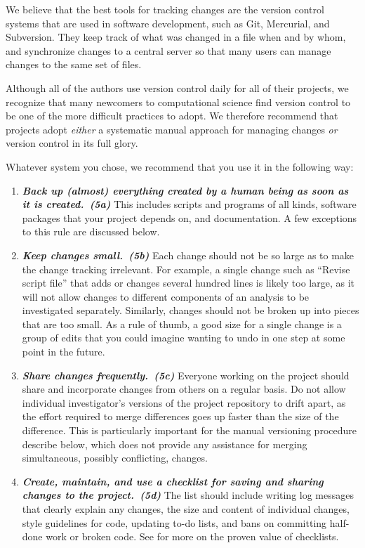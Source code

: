 \documentclass[10pt,letterpaper]{article}
\newcommand{\practice}[2]{\textbf{\emph{{#2}~({#1})}}}
\begin{document}
We believe that the best tools for tracking changes are the version
control systems that are used in software development, such as Git,
Mercurial, and Subversion. They keep track of what was changed in a
file when and by whom, and synchronize changes to a central server so
that many users can manage changes to the same set of files.

Although all of the authors use version control daily for all of their
projects, we recognize that many newcomers to computational science
find version control to be one of the more difficult practices to
adopt.  We therefore recommend that projects adopt \emph{either} a
systematic manual approach for managing changes \emph{or} version
control in its full glory.

Whatever system you chose, we recommend that you use it in the following way:

\begin{enumerate}

\item
  \practice{5a}{Back up (almost) everything created by a human being as
    soon as it is created.} This includes scripts and programs of all
  kinds, software packages that your project depends on, and
  documentation. A few exceptions to this rule are discussed below.

\item
  \practice{5b}{Keep changes small.}  Each change should not be so large
  as to make the change tracking irrelevant. For example, a single
  change such as ``Revise script file'' that adds or changes several
  hundred lines is likely too large, as it will not allow changes to
  different components of an analysis to be investigated
  separately. Similarly, changes should not be broken up into pieces
  that are too small. As a rule of thumb, a good size for a single change is
  a group of edits that you could imagine wanting to undo in one step
  at some point in the future.

\item
  \practice{5c}{Share changes frequently.} Everyone working on the
  project should share and incorporate changes from others on a
  regular basis. Do not allow individual investigator's versions of
  the project repository to drift apart, as the effort required to
  merge differences goes up faster than the size of the
  difference. This is particularly important for the manual versioning
  procedure describe below, which does not provide any
  assistance for merging simultaneous, possibly conflicting, changes.

\item
  \practice{5d}{Create, maintain, and use a checklist for saving and
    sharing changes to the project.}  The list should include writing
  log messages that clearly explain any changes, the size and content
  of individual changes, style guidelines for code, updating to-do
  lists, and bans on committing half-done work or broken code.  See
  \cite{gawande2011} for more on the proven value of checklists.

\end{enumerate}
\end{document}
